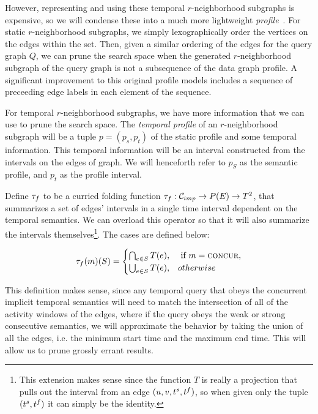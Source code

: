 However, representing and using these temporal $r$-neighborhood subgraphs is
expensive, so we will condense these into a much more lightweight
\textit{profile}~\cite{2008-SIGMOD-GraphQL}. For static $r$-neighborhood
subgraphs, we simply lexographically order the vertices on the edges within the
set. Then, given a similar ordering of the edges for the query graph $Q$, we
can prune the search space when the generated $r$-neighborhood subgraph of the
query graph is not a subsequence of the data graph profile. A significant
improvement to this original profile models \cite{2012-VLDB-IsoSurvey} includes
a sequence of preceeding edge labels in each element of the sequence. 

For temporal $r$-neighborhood subgraphs, we have more information that we can
use to prune the search space. The \textit{temporal profile} of an
$r$-neighborhood subgraph will be a tuple $p = (p_s,p_t)$ of the static profile and
some temporal information. This temporal information will be an interval
constructed from the intervals on the edges of graph. We will henceforth refer
to $p_S$ as the semantic profile, and $p_t$ as the profile interval.

\begin{defn}
  Define $\tau_f$ to be a curried folding function $\tau_f : \mathcal{C}_{imp} \to
  P(E) \to T^2$, that summarizes a set of edges' intervals in a single time
  interval dependent on the temporal semantics. We can overload this operator so
  that it will also summarize the intervals themselves\footnote{This extension
    makes sense since the function $T$ is really a projection that pulls out the
    interval from an edge $(u,v, t^s, t^f)$, so when given only the tuple $(t^s,
    t^f)$ it can simply be the identity.}. The cases are defined below:

  \[
    \tau_f(m)(S) = \begin{cases}
      \bigcap_{e \in S} T(e), & \text{ if } m = \textsc{concur}, \\
      \bigcup_{e \in S} T(e), & otherwise
    \end{cases}
  \]
  
\end{defn}

This definition makes sense, since any temporal query that obeys the
concurrent implicit temporal semantics will need to match the intersection of
all of the activity windows of the edges, where if the query obeys the weak or
strong consecutive semantics, we will approximate the behavior by taking the
union of all the edges, i.e. the minimum start time and the maximum end
time. This will allow us to prune grossly errant results.

